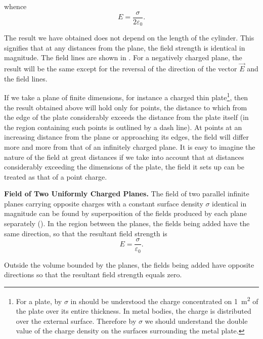 \noindent
whence
\begin{equation}\label{eq:1_120}
	E = \frac{\sigma}{2\varepsilon_0}.
\end{equation}

\noindent
The result we have obtained does not depend on the length of the cylinder. This signifies that at any distances from the plane, the field strength is identical in magnitude. The field lines are shown in . For a negatively charged plane, the result will be the same except for the reversal of the direction of the vector $\vec{E}$ and the field lines.

If we take a plane of finite dimensions, for instance a charged thin plate\footnote{For a plate, by $\sigma$ in  should be understood the charge concentrated on \SI{1}{\metre\squared} of the plate over its entire thickness. In metal bodies, the charge is distributed over the external surface. Therefore by $\sigma$ we should understand the double value of the charge density on the surfaces surrounding the metal plate.}, then the result obtained above will hold only for points, the distance to which from the edge of the plate considerably exceeds the distance from the plate itself (in  the region containing such points is outlined by a dash line). At points at an increasing distance from the plane or approaching its edges, the field will differ more and more from that of an infinitely charged plane. It is easy to imagine the nature of the field at great distances if we take into account that at distances considerably exceeding the dimensions of the plate, the field it sets up can be treated as that of a point charge.

\textbf{Field of Two Uniformly Charged Planes.} The field of two parallel infinite planes carrying opposite charges with a constant surface density $\sigma$ identical in magnitude can be found by superposition of the fields produced by each plane separately (). In the region between the planes, the fields being added have the same direction, so that the resultant field strength is
\begin{equation}\label{eq:1_121}
	E = \frac{\sigma}{\varepsilon_0}.
\end{equation}

\noindent
Outside the volume bounded by the planes, the fields being added have opposite directions so that the resultant field strength equals zero.

